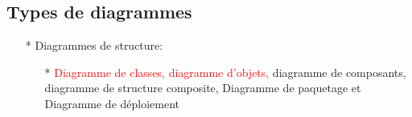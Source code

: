 \documentclass[12pt]{article}
\begin{document}
\subsection{Types de diagrammes}
\begin{itemize}
	\item[* ]  Diagrammes de structure:
	\begin{itemize}
		\item[* ] \textcolor{red}{Diagramme de classes, diagramme d'objets,} diagramme de composants, diagramme de structure composite,
		Diagramme de paquetage et Diagramme de déploiement
	\end{itemize}
\end{itemize}
\end{document}
